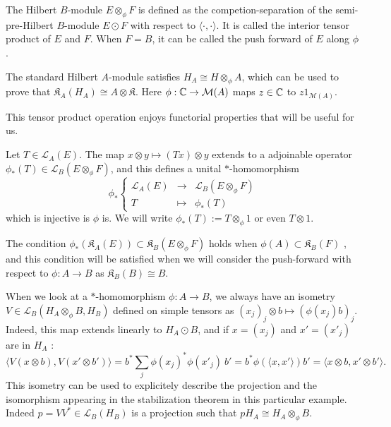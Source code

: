 \begin{definition}
The Hilbert $B$-module $E\otimes_\phi F$ is defined as the competion-separation of the semi-pre-Hilbert $B$-module $E\odot F$ with respect to $\langle \cdot , \cdot \rangle$. It is called the interior tensor product of $E$ and $F$. When $F=B$, it can be called the push forward of $E$ along $\phi$.
\end{definition} 

\begin{Expl}
The standard Hilbert $A$-module satisfies $H_A \cong H\otimes_\phi A$, which can be used to prove that $\mathfrak K_A(H_A) \cong A\otimes \mathfrak K$. Here $\phi : \mathbb C\rightarrow \mathcal M(A)$ maps $z\in \mathbb C$ to $z1_{\mathcal M(A)}$.
\end{Expl}

This tensor product operation enjoys functorial properties that will be useful for us. 

\begin{prop}\cite{Lance}
Let $T\in\mathcal L_A(E)$. The map $x\otimes y \mapsto (Tx)\otimes y$ extends to a adjoinable operator $\phi_*(T)\in\mathcal L_B(E\otimes_\phi F)$, and this defines a unital $*$-homomorphism 
\[\phi_*\left\{\begin{array}{rcl} \mathcal L_A(E) & \rightarrow & \mathcal L_B(E\otimes_\phi F) \\ T & \mapsto & \phi_*(T)\end{array}\right.\]
which is injective is $\phi$ is. We will write $\phi_*(T) := T\otimes_\phi 1$ or even $T\otimes 1$. 
\end{prop} 

\begin{rk}
The condition $\phi_*(\mathfrak K_A(E))\subset \mathfrak K_B(E\otimes_\phi F)$ holds when $\phi(A)\subset \mathfrak K_B(F)$ \cite{Lance}, and this condition will be satisfied when we will consider the push-forward with respect to $\phi : A\rightarrow B$ as $\mathfrak K_B(B) \cong B$. 
\end{rk}

\begin{rk}\label{isometry}
When we look at a $*$-homomorphism $\phi : A\rightarrow B$, we always have an isometry $V\in \mathcal L_B ( H_A\otimes_\phi B , H_B)$ defined on simple tensors as $(x_j)_j\otimes b \mapsto (\phi(x_j)b)_j$. Indeed, this map extends linearly to $H_A \odot B$, and if $x = (x_j)$ and $x'=(x'_j)$ are in $H_A$ : 
\[\langle V (x\otimes b) , V(x'\otimes b')\rangle = b^* \sum_j \phi(x_j)^* \phi(x'_j) \  b' = b^*\phi(\langle x, x' \rangle)b' = \langle x\otimes b , x'\otimes b' \rangle . \] %
This isometry can be used to explicitely describe the projection and the isomorphism appearing in the stabilization theorem in this particular example. Indeed $p = VV^*\in\mathcal L_B(H_B)$ is a projection such that $p H_A \cong H_A\otimes_\phi B $.  
\end{rk}
